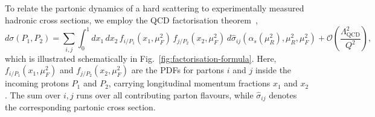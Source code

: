 To relate the partonic dynamics of a hard scattering to experimentally
measured hadronic cross sections, we employ the QCD factorisation
theorem~\cite{Collins:1985ue,Collins:1988ig,Collins:1989gx},
\begin{equation}
\label{eq:factorisation-formula}
    d\sigma(P_1,P_2) = \sum_{i,j}\int_0^1 dx_1\,dx_2\,
    f_{i/P_1}(x_1,\mu_F^2)\,f_{j/P_2}(x_2,\mu_F^2)\,
    d\hat{\sigma}_{ij}\!\left(\alpha_s(\mu_R^2),\mu_R^2,\mu_F^2\right)
    + \mathcal{O}\!\left(\frac{\Lambda_{\mathrm{QCD}}^2}{Q^2}\right),
\end{equation}
which is illustrated schematically in Fig.~\ref{fig:factorisation-formula}.
Here, $f_{i/P_1}(x_1,\mu_F^2)$ and $f_{j/P_2}(x_2,\mu_F^2)$ are the 
PDFs for partons $i$ and $j$ inside the incoming protons $P_1$ and 
$P_2$, carrying longitudinal momentum fractions $x_1$ and $x_2$.
The sum over $i,j$ runs over all contributing parton flavours, while 
$\hat{\sigma}_{ij}$ denotes the corresponding partonic cross section.


